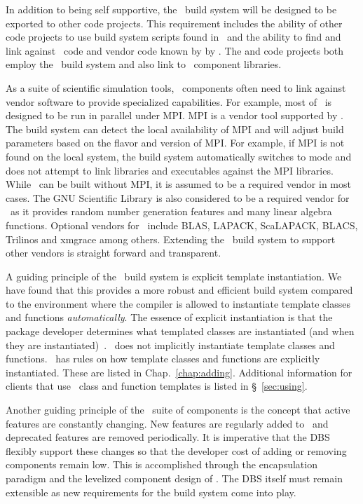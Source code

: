 In addition to being self supportive, the \draco\ build system will be designed to be exported to other code projects.  This requirement includes the ability of other code projects to use build system scripts found in \draco\ and the ability to find and link against \draco\ code and vendor code known by by \draco.  The  and  code projects both employ the \draco\ build system and also link to \draco\ component libraries.

As a suite of scientific simulation tools, \draco\ components often need to link against vendor software to provide specialized capabilities.  For example, most of \draco\ is designed to be run in parallel under MPI.  MPI is a vendor tool supported by \draco.  The build system can detect the local availability of MPI and will adjust build parameters based on the flavor and version of MPI.  For example, if MPI is not found on the local system, the build system automatically switches to  mode and does not attempt to link libraries and executables against the MPI libraries.  While \draco\ can be built without MPI, it is assumed to be a required vendor in most cases.  The GNU Scientific Library is also considered to be a required vendor for \draco\ as it provides random number generation  features and many linear algebra functions.  Optional vendors for \draco\ include BLAS, LAPACK, ScaLAPACK, BLACS, Trilinos and xmgrace among others.  Extending the \draco\ build system to support other vendors is straight forward and transparent.

A guiding principle of the \draco\ build system is explicit template
instantiation.   We have found that this provides a  more robust
and efficient build system compared to the environment where the compiler is allowed to
instantiate template classes and functions {\it automatically}.  The essence of explicit
instantiation is that the package developer determines what templated classes
are instantiated (and when they are instantiated)~\cite{cpptemplates}.  \draco\ does not implicitly
instantiate template classes and functions.  \draco\ has rules on how
template classes and functions are explicitly instantiated.  These are
listed in Chap.~\ref{chap:adding}.  Additional information for clients
that use \draco\ class and function templates is listed in
\S~\ref{sec:using}.

Another guiding principle of the \draco\ suite of components is the concept that active features are constantly changing.  New features are regularly added to \draco\ and deprecated features are removed periodically.  It is imperative that the DBS flexibly support these changes so that the developer cost of adding or removing components remain low.   This is accomplished through the encapsulation paradigm and the levelized component design of \draco.  The DBS itself must remain extensible as new requirements for the build system come into play.

